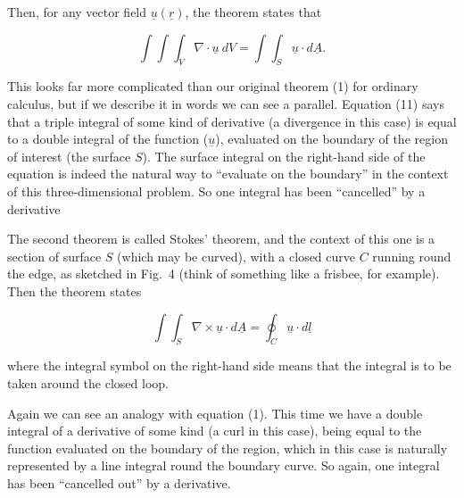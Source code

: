   Then, for any vector field $\underline{u}(\underline{r})$, the theorem states 
  that 

  $$\int{\int{\int_V{\nabla \cdot \underline{u} \mathrm{~} 
  dV}}}=\int{\int_S{\underline{u} \cdot d\underline{A}}} . \tag{11}$$ 

  This looks far more complicated than our original theorem (1) for ordinary 
  calculus, but if we describe it in words we can see a parallel. Equation (11) 
  says that a triple integral of some kind of derivative (a divergence in this 
  case) is equal to a double integral of the function ($\underline{u}$), 
  evaluated on the boundary of the region of interest (the surface $S$). The 
  surface integral on the right-hand side of the equation is indeed the natural 
  way to ``evaluate on the boundary'' in the context of this three-dimensional 
  problem. So one integral has been ``cancelled'' by a derivative 

  The second theorem is called Stokes' theorem, and the context of this one is 
  a section of surface $S$ (which may be curved), with a closed curve $C$ 
  running round the edge, as sketched in Fig.\ 4 (think of something like a 
  frisbee, for example). Then the theorem states 

  $$\int{\int_S{\nabla \times \underline{u} \cdot d\underline{A}}} = 
  \oint_C{\underline{u} \cdot d\underline{l}} \tag{12}$$ 

  where the integral symbol on the right-hand side means that the integral is 
  to be taken around the closed loop. 


  Again we can see an analogy with equation (1). This time we have a double 
  integral of a derivative of some kind (a curl in this case), being equal to 
  the function evaluated on the boundary of the region, which in this case is 
  naturally represented by a line integral round the boundary curve. So again, 
  one integral has been ``cancelled out'' by a derivative. 